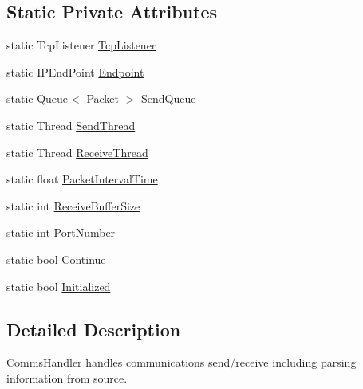 \subsection*{Static Private Attributes}
\begin{DoxyCompactItemize}
\item 
static Tcp\+Listener \hyperlink{class_robotics_library_1_1_communications_1_1_comm_handler_a1f06912e8a026624986cda6fa0d7f7ac}{Tcp\+Listener}
\item 
static I\+P\+End\+Point \hyperlink{class_robotics_library_1_1_communications_1_1_comm_handler_a9fdb1b92fa7ca7e35ffe8c474e41bfe9}{Endpoint}
\item 
static Queue$<$ \hyperlink{class_robotics_library_1_1_communications_1_1_packet}{Packet} $>$ \hyperlink{class_robotics_library_1_1_communications_1_1_comm_handler_acd3be385dfa108ad8d44fd2dee2560d8}{Send\+Queue}
\item 
static Thread \hyperlink{class_robotics_library_1_1_communications_1_1_comm_handler_af35ae76be97571d4e0ce17545a583552}{Send\+Thread}
\item 
static Thread \hyperlink{class_robotics_library_1_1_communications_1_1_comm_handler_afe2da330fb8f338d43af853fcb2bdfc7}{Receive\+Thread}
\item 
static float \hyperlink{class_robotics_library_1_1_communications_1_1_comm_handler_a8f90dd3c3703a0fad473842c2507a477}{Packet\+Interval\+Time}
\item 
static int \hyperlink{class_robotics_library_1_1_communications_1_1_comm_handler_a40a05621969ec969179a7f17eb2e64f3}{Receive\+Buffer\+Size}
\item 
static int \hyperlink{class_robotics_library_1_1_communications_1_1_comm_handler_a90a9510a5fb347278c41736032829323}{Port\+Number}
\item 
static bool \hyperlink{class_robotics_library_1_1_communications_1_1_comm_handler_a5a78eb290748121e4dfa9e8be8ed4077}{Continue}
\item 
static bool \hyperlink{class_robotics_library_1_1_communications_1_1_comm_handler_a29a665284d45e4c95b21055b5690b658}{Initialized}
\end{DoxyCompactItemize}


\subsection{Detailed Description}
Comms\+Handler handles communications send/receive including parsing information from source. 



